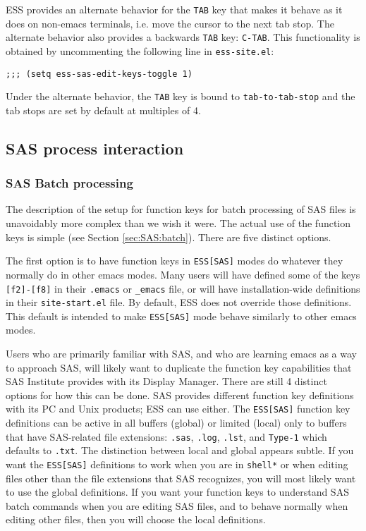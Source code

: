 \documentclass{article}
\begin{document}
ESS provides an alternate behavior for the {\tt TAB} key that makes it
behave as it does on non-emacs terminals, i.e. move the cursor to the
next tab stop.  The alternate behavior also provides a backwards {\tt TAB}
key: {\tt C-TAB}.  This functionality is obtained by uncommenting the
following line in {\tt ess-site.el}:
\begin{verbatim}
;;; (setq ess-sas-edit-keys-toggle 1)
\end{verbatim}
Under the alternate behavior, the {\tt TAB} key is bound to {\tt tab-to-tab-stop}
and the tab stops are set by default at multiples of 4.

\subsection{SAS process interaction}
\label{sec:SAS:proc}


\subsubsection{SAS Batch processing}
\label{sec:SAS:proc:batch}

The description of the setup for function keys for batch processing of
SAS files is unavoidably more complex than we wish it were.  The actual
use of the function keys is simple (see Section \ref{sec:SAS:batch}).
There are five distinct options.

The first option is to have function keys in {\tt ESS[SAS]} modes do
whatever they normally do in other emacs modes.  Many users will have
defined some of the keys {\tt[f2]-[f8]} in their \verb+.emacs+ or
\verb|_emacs| file, or will have installation-wide definitions in
their {\tt site-start.el} file.  By default, ESS does not override those
definitions.  This default is intended to make {\tt ESS[SAS]} mode behave
similarly to other emacs modes.

Users who are primarily familiar with SAS, and who are learning emacs
as a way to approach SAS, will likely want to duplicate the function
key capabilities that SAS Institute provides with its Display Manager.
There are still 4 distinct options for how this can be done.  SAS
provides different function key definitions with its PC and Unix
products; ESS can use either.  The {\tt ESS[SAS]} function key definitions
can be active in all buffers (global) or limited (local) only to
buffers that have SAS-related file extensions: {\tt .sas}, {\tt .log}, {\tt .lst}, and
{\tt Type-1} which defaults to {\tt .txt}.  The distinction between local and
global appears subtle.  If you want the {\tt ESS[SAS]} definitions to work
when you are in {\tt *shell*} or when editing files other than the file
extensions that SAS recognizes, you will most likely want to use the
global definitions.  If you want your function keys to understand SAS
batch commands when you are editing SAS files, and to behave normally
when editing other files, then you will choose the local definitions.
\end{document}
